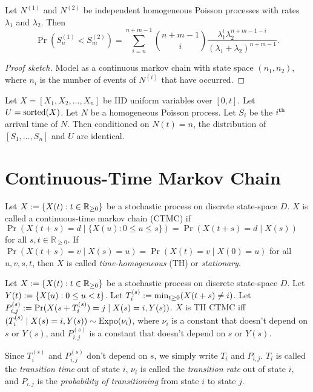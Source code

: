 \documentclass[a4paper, 12pt, fleqn]{article}
\DeclareMathOperator{\Expo}{\opname{Expo}}
\begin{document}
\begin{lemma}
Let $N^{(1)}$ and $N^{(2)}$ be independent homogeneous Poisson processes
with rates $\lambda_1$ and $\lambda_2$. Then
\[ \Pr(S^{(1)}_n < S^{(2)}_m) = \sum_{i=n}^{n+m-1} \binom{n+m-1}{i}
    \frac{\lambda_1^i\lambda_2^{n+m-1-i}}{(\lambda_1 + \lambda_2)^{n+m-1}}. \]
\end{lemma}
\begin{proof}[Proof sketch]
Model as a continuous markov chain with state space $(n_1, n_2)$,
where $n_i$ is the number of events of $N^{(i)}$ that have occurred.
\end{proof}

\begin{theorem}
Let $X = [X_1, X_2, \ldots, X_n]$ be IID uniform variables over $[0, t]$.
Let $U = \operatorname{sorted}(X)$. Let $N$ be a homogeneous Poisson process.
Let $S_i$ be the $i^{\textrm{th}}$ arrival time of $N$.
Then conditioned on $N(t) = n$, the distribution of $[S_1, \ldots, S_n]$ and $U$ are identical.
\end{theorem}

\section{Continuous-Time Markov Chain}

\begin{definition}[CTMC]
Let $X := \{X(t): t \in \mathbb{R}_{\ge 0}\}$ be a stochastic process
on discrete state-space $D$.
$X$ is called a continuous-time markov chain (CTMC) if
$\Pr(X(t+s) = d \mid \{X(u): 0 \le u \le s\}) = \Pr(X(t+s)=d \mid X(s))$
for all $s, t \in \mathbb{R}_{\ge 0}$.
If $\Pr(X(t+s)=v \mid X(s)=u) = \Pr(X(t)=v \mid X(0)=u)$ for all $u, v, s, t$,
then $X$ is called \emph{time-homogeneous} (TH) or \emph{stationary}.
\end{definition}

\begin{theorem}
Let $X := \{X(t): t \in \mathbb{R}_{\ge 0}\}$ be a stochastic process
on discrete state-space $D$. Let $Y(t) := \{X(u): 0 \le u < t \}$.
Let $T_i^{(s)} := \min_{t \ge 0} (X(t+s) \neq i)$.
Let $P^{(s)}_{i,j} := \Pr(X(s+T_i^{(s)})=j \mid X(s)=i, Y(s))$.
$X$ is TH CTMC iff $(T_i^{(s)} \mid X(s)=i, Y(s)) \sim \Expo(\nu_i)$,
where $\nu_i$ is a constant that doesn't depend on $s$ or $Y(s)$,
and $P^{(s)}_{i,j}$ is a constant that doesn't depend on $s$ or $Y(s)$.

Since $T_i^{(s)}$ and $P^{(s)}_{i,j}$ don't depend on $s$, we simply write $T_i$ and $P_{i,j}$.
$T_i$ is called the \emph{transition time} out of state $i$,
$\nu_i$ is called the \emph{transition rate} out of state $i$,
and $P_{i,j}$ is the \emph{probability of transitioning} from state $i$ to state $j$.
\end{theorem}
\end{document}
